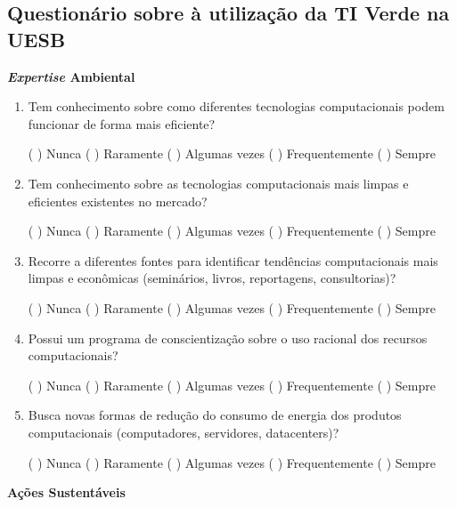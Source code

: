 \begin{apendicesenv} 

\partapendices

\chapter{Questionário sobre à utilização da TI Verde na UESB}
\textbf{\textit{Expertise} Ambiental}
\begin{enumerate}
    \item Tem conhecimento sobre como diferentes tecnologias computacionais podem funcionar de forma mais eficiente? 
    
    ( \space\space ) Nunca  ( \space\space ) Raramente  ( \space\space ) Algumas vezes  ( \space\space ) Frequentemente ( \space\space ) Sempre
    \item Tem conhecimento sobre as tecnologias computacionais mais limpas e eficientes existentes no mercado? 
    
    ( \space\space ) Nunca  ( \space\space ) Raramente  ( \space\space ) Algumas vezes  ( \space\space ) Frequentemente ( \space\space ) Sempre
    \item Recorre a diferentes fontes para identificar tendências computacionais mais limpas e econômicas (seminários, livros, reportagens, consultorias)? 
    
    ( \space\space ) Nunca  ( \space\space ) Raramente  ( \space\space ) Algumas vezes  ( \space\space ) Frequentemente ( \space\space ) Sempre
    \item Possui um programa de conscientização sobre o uso racional dos recursos computacionais? 
    
    ( \space\space ) Nunca  ( \space\space ) Raramente  ( \space\space ) Algumas vezes  ( \space\space ) Frequentemente ( \space\space ) Sempre
    \item Busca novas formas de redução do consumo de energia dos produtos computacionais (computadores, servidores, datacenters)? 
    
    ( \space\space ) Nunca  ( \space\space ) Raramente  ( \space\space ) Algumas vezes  ( \space\space ) Frequentemente ( \space\space ) Sempre
\end{enumerate}
    
\textbf{Ações Sustentáveis}


\end{apendicesenv}
